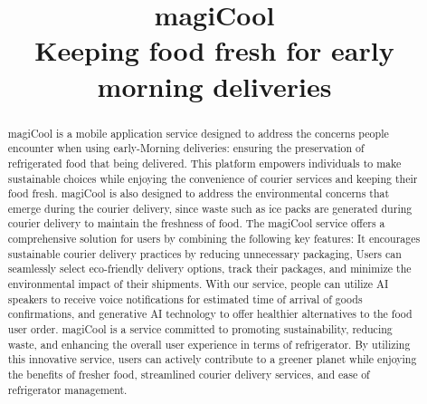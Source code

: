 \documentclass[conference]{IEEEtran}
\begin{document}
\title{magiCool\\
{\footnotesize \large Keeping food fresh for early morning deliveries}}

\author{
\and
{}
\and
{}
}
\maketitle

\begin{abstract}
magiCool is a mobile application service designed to address the concerns people encounter when using early-Morning deliveries: ensuring the preservation of refrigerated food that being delivered. This platform empowers individuals to make sustainable choices while enjoying the convenience of courier services and keeping their food fresh. magiCool is also designed to address the environmental concerns that emerge during the courier delivery, since waste such as ice packs are generated during courier delivery to maintain the freshness of food. The magiCool service offers a comprehensive solution for users by combining the following key features: It encourages sustainable courier delivery practices by reducing unnecessary packaging,  Users can seamlessly select eco-friendly delivery options, track their packages, and minimize the environmental impact of their shipments. With our service, people can utilize AI speakers to receive voice notifications for estimated time of arrival of goods confirmations, and generative AI technology to offer healthier alternatives to the food user order. 
magiCool is a service committed to promoting sustainability, reducing waste, and enhancing the overall user experience in terms of refrigerator. By utilizing this innovative service, users can actively contribute to a greener planet while enjoying the benefits of fresher food, streamlined courier delivery services, and ease of refrigerator management.  

\end{abstract}
\end{document}

